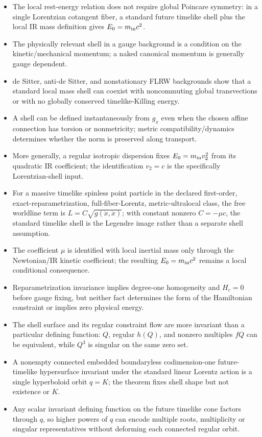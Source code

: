 \documentclass[11pt,a4paper]{article}
\begin{document}
\begin{itemize}
\item The local rest-energy relation does not require global Poincare symmetry: in a single Lorentzian cotangent fiber, a standard future timelike shell plus the local IR mass definition gives $E_0=m_{\rm in}c^2$.
\item The physically relevant shell in a gauge background is a condition on the kinetic/mechanical momentum; a naked canonical momentum is generally gauge dependent.
\item de Sitter, anti-de Sitter, and nonstationary FLRW backgrounds show that a standard local mass shell can coexist with noncommuting global transvections or with no globally conserved timelike-Killing energy.
\item A shell can be defined instantaneously from $g_x$ even when the chosen affine connection has torsion or nonmetricity; metric compatibility/dynamics determines whether the norm is preserved along transport.
\item More generally, a regular isotropic dispersion fixes $E_0=m_{\rm in}v_2^2$ from its quadratic IR coefficient; the identification $v_2=c$ is the specifically Lorentzian-shell input.
\item For a massive timelike spinless point particle in the declared first-order, exact-reparametrization, full-fiber-Lorentz, metric-ultralocal class, the free worldline term is $L=C\sqrt{g(\dot x,\dot x)}$; with constant nonzero $C=-\mu c$, the standard timelike shell is the Legendre image rather than a separate shell assumption.
\item The coefficient $\mu$ is identified with local inertial mass only through the Newtonian/IR kinetic coefficient; the resulting $E_0=m_{\rm in}c^2$ remains a local conditional consequence.
\item Reparametrization invariance implies degree-one homogeneity and $H_c=0$ before gauge fixing, but neither fact determines the form of the Hamiltonian constraint or implies zero physical energy.
\item The shell surface and its regular constraint flow are more invariant than a particular defining function: $Q$, regular $h(Q)$, and nonzero multiples $fQ$ can be equivalent, while $Q^3$ is singular on the same zero set.
\item A nonempty connected embedded boundaryless codimension-one future-timelike hypersurface invariant under the standard linear Lorentz action is a single hyperboloid orbit $q=K$; the theorem fixes shell shape but not existence or $K$.
\item Any scalar invariant defining function on the future timelike cone factors through $q$, so higher powers of $q$ can encode multiple roots, multiplicity or singular representatives without deforming each connected regular orbit.

\end{itemize}
\end{document}
